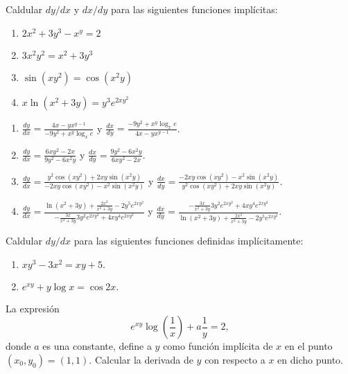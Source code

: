 {Caldular $dy/dx$ y $dx/dy$ para las siguientes funciones implícitas:
\begin{enumerate}
\item $2x^2+3y^3-x^y= 2$
\item $3x^2y^2 = x^2 + 3y^3$
\item $\sin (xy^2) = \cos(x^2y)$
\item $x \ln (x^2+3y)  = y^3e^{2xy^2}$
\end{enumerate}
}
{\begin{enumerate}
\item $\frac{dy}{dx} = \frac{4x-yx^{y-1}}{-9y^2+x^y\log_x e}$ y $\frac{dx}{dy} = \frac{-9y^2+x^y\log_x e}{4x-yx^{y-1}}$.
\item $\frac{dy}{dx} = \frac{6xy^2-2x}{9y^2-6x^2y}$ y $\frac{dx}{dy} = \frac{9y^2-6x^2y}{6xy^2-2x}$.
\item $\frac{dy}{dx} = \frac{y^2\cos(xy^2)+2xy\sin(x^2y)}{-2xy\cos(xy^2)-x^2\sin(x^2y)}$ y $\frac{dx}{dy} = \frac{-2xy\cos(xy^2)-x^2\sin(x^2y)}{y^2\cos(xy^2)+2xy\sin(x^2y)}$.
\item $\frac{dy}{dx} = \frac{\ln(x^2+3y)+\frac{2x^2}{x^2+3y}-2y^5e^{2xy^2}}{-\frac{3x}{x^2+3y}3y^2e^{2xy^2}+4xy^4e^{2xy^2}}$ y $\frac{dx}{dy} = \frac{-\frac{3x}{x^2+3y}3y^2e^{2xy^2}+4xy^4e^{2xy^2}}{\ln(x^2+3y)+\frac{2x^2}{x^2+3y}-2y^5e^{2xy^2}}$.
\end{enumerate}
}
{
}


{Caldular $dy/dx$ para las siguientes funciones definidas implícitamente:
\begin{enumerate}
\item  $xy^{3}-3x^{2}=xy+5.$
\item  $e^{xy}+y\log x=\cos 2x.$
\end{enumerate}
}


{La expresión
\[
e^{xy}\log \left( \dfrac{1}{x}\right) +a\dfrac{1}{y}=2,
\]
donde $a$ es una constante, define a $y$ como función implícita de $x $ en el punto $\left( x_{0},y_{0}\right) =\left( 1,1\right) .$
Calcular la derivada de $y$ con respecto a $x$ en dicho punto.
}

